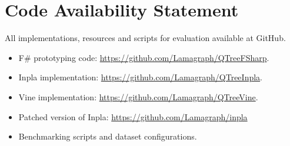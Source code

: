 \section{Code Availability Statement}

All implementations, resources and scripts for evaluation available at GitHub.

\begin{itemize}
    \item F\# prototyping code: \url{https://github.com/Lamagraph/QTreeFSharp}.
    \item Inpla implementation: \url{https://github.com/Lamagraph/QTreeInpla}.
    \item Vine implementation: \url{https://github.com/Lamagraph/QTreeVine}.
    \item Patched version of Inpla: \url{https://github.com/Lamagraph/inpla}
    \item Benchmarking scripts and dataset configurations.
\end{itemize}